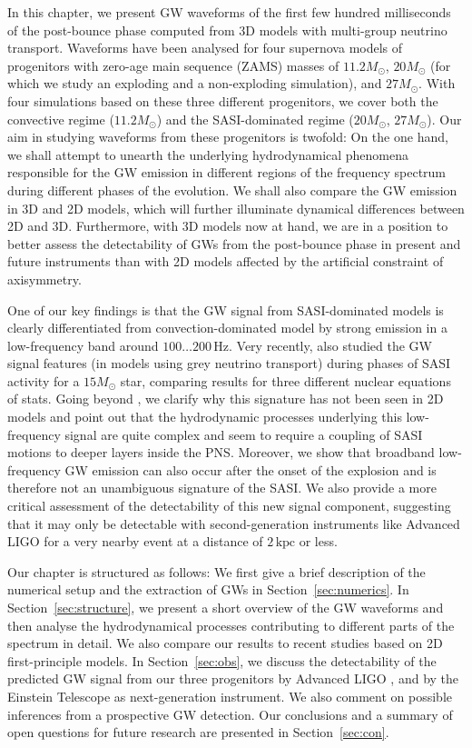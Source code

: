 In this chapter, we present GW waveforms of the
first few hundred milliseconds of the post-bounce phase computed from 3D
models with multi-group neutrino transport. Waveforms have been
analysed for four supernova models of progenitors with zero-age main
sequence (ZAMS) masses of $11.2 M_\odot$, $20 M_\odot$  (for which
we study an exploding and a non-exploding simulation), and $27
M_\odot$. With four simulations based on these three different
progenitors, we cover both the convective
regime ($11.2 M_\odot$) and the SASI-dominated regime ($20 M_\odot$,
$27 M_\odot$). Our aim in studying waveforms from these progenitors is
twofold: On the one hand, we shall attempt to unearth the underlying
hydrodynamical phenomena responsible for the GW emission in different 
regions of the frequency spectrum during different
phases of the evolution.  We shall also compare the GW
emission in 3D and 2D models, which will further illuminate dynamical
differences between 2D and 3D. Furthermore, with 3D models now
at hand, we are in a position to better assess the detectability of
GWs from the post-bounce phase in present and future
instruments than with 2D models affected by the artificial constraint
of axisymmetry.

One of our key findings is that the GW signal 
from SASI-dominated models is clearly differentiated from convection-dominated model 
by strong emission in a low-frequency band around $100 \ldots 200 \, \mathrm{Hz}$. 
Very recently, \cite{kuroda_16} also studied the GW signal 
features (in models using grey neutrino transport) during phases of SASI activity for a $15 M_\odot$ star,
comparing results for three different nuclear equations of stats. Going beyond \cite{kuroda_16}, we clarify why this 
signature has not been seen in 2D models and point out that the hydrodynamic processes underlying 
this low-frequency signal are quite complex and seem to require a coupling of SASI motions to deeper 
layers inside the PNS. Moreover, we show that broadband low-frequency GW emission 
can also occur after the onset of the explosion and is therefore not an unambiguous signature of 
the SASI. We also provide a more critical assessment of the detectability of this new signal component, 
suggesting that it may only be detectable with second-generation instruments like Advanced LIGO for a very 
nearby event at a distance of $2 \, \mathrm{kpc}$ or less.

Our chapter is structured as follows: We first give a brief
description of the numerical setup and the extraction of
GWs in Section~\ref{sec:numerics}.
In Section~\ref{sec:structure}, we present a short overview
of the GW waveforms and then analyse the hydrodynamical
processes contributing to different parts of the spectrum
in detail. We also compare our results to recent studies
based on 2D first-principle models.
In Section~\ref{sec:obs}, we discuss the detectability
of the predicted GW signal from our
three progenitors by Advanced LIGO \citep{advligo_15},
and by the Einstein Telescope \citep{et_12} as next-generation
instrument. We also comment on possible inferences
from a prospective GW detection. Our
conclusions and a summary of open questions for
future research are presented in Section~\ref{sec:con}.

